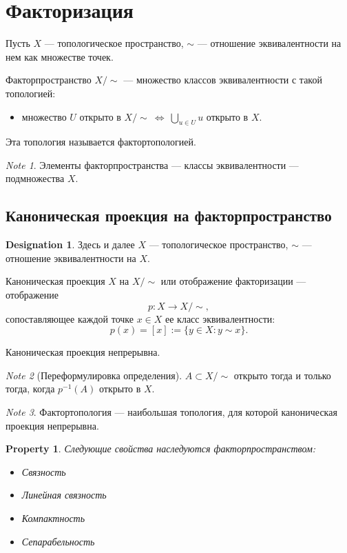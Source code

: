 \documentclass[11pt]{book}
\theoremstyle{definition}
\theoremstyle{plain}
\theoremstyle{plain}
\newtheorem*{prop}{Property}
\theoremstyle{definition}
\newtheorem*{name}{Designation}
\theoremstyle{remark}
\newtheorem*{note}{Note}
\begin{document}
\section{Факторизация}
\begin{defn}
    Пусть $ X$ --- топологическое пространство, $ \sim $ --- отношение эквивалентности на нем как множестве точек.

    Факторпространство $ X/\!\sim $ --- множество классов эквивалентности с такой топологией:
    \begin{itemize}
	\item  множество $ U$ открыто в $ X/\!\sim ~\Longleftrightarrow ~\bigcup_{u \in  U} u$ открыто в $ X$.
    \end{itemize}
    Эта топология называется фактортопологией.
\end{defn}
\begin{note}
    Элементы факторпространства --- классы эквивалентности  --- подмножества $ X$.
\end{note}
\subsection{Каноническая проекция на факторпространство}
\begin{name}
    Здесь и далее $ X$ ---  топологическое пространство, $ \sim $ --- отношение эквивалентности на $ X$.
\end{name}
\begin{defn}
    Каноническая проекция $ X$ на $ X /\! \sim $ или отображение факторизации --- отображение
    \[
	p: X \to  X/\!\sim
    ,\]
    сопоставляющее каждой точке $ x \in  X$ ее класс эквивалентности:
    \[
	p(x) = [x]:=\{y \in  X: y \sim x\}
    .\]
\end{defn}
\begin{thm}
    Каноническая проекция непрерывна.
\end{thm}
\begin{note}[Переформулировка определения]
    $ A \subset X / \!\sim $ открыто тогда и только тогда, когда  $ p^{-1}(A)$ открыто в $ X$.
\end{note}
\begin{note}
    Фактортопология --- наибольшая топология, для которой каноническая проекция непрерывна.
\end{note}
\begin{prop}
    Следующие свойства наследуются факторпространством:
    $ $
    \begin{itemize}
	\item Связность
	\item Линейная связность
	\item Компактность
	\item Сепарабельность
    \end{itemize}
\end{prop}
\end{document}
